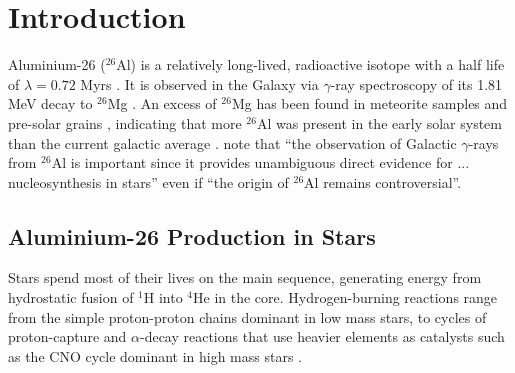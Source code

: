 \section{Introduction} %

Aluminium-26 ($^{26}$Al) is a relatively long-lived, radioactive isotope with a half life of $\lambda = 0.72$ Myrs \citep{Iliadis2015}.
It is observed in the Galaxy via $\gamma$-ray spectroscopy of its 1.81 MeV decay to $^{26}$Mg \citep{2004ESASP.552...27D}.
An excess of $^{26}$Mg has been found in meteorite samples \citep{1978ApJ...224L.139A} and pre-solar grains \citep{2011ApJS..193...16I}, indicating that more $^{26}$Al was present in the early solar system than the current galactic average \citep[see][]{2019ApJ...884...38B}.
\cite{2011ApJS..193...16I} note that ``the observation of Galactic $\gamma$-rays from $^{26}$Al is important since it provides unambiguous direct evidence for ... nucleosynthesis in stars'' even if ``the origin of $^{26}$Al remains controversial''.

\subsection{Aluminium-26 Production in Stars}


Stars spend most of their lives on the main sequence, generating energy from hydrostatic fusion of $^1$H into $^4$He in the core.
Hydrogen-burning reactions range from the simple proton-proton chains dominant in low mass stars, to cycles of proton-capture and $\alpha$-decay reactions that use heavier elements as catalysts such as the CNO cycle dominant in high mass stars \citep{Iliadis2015}.

